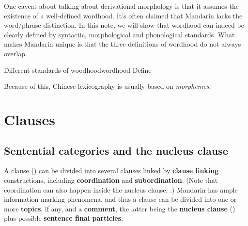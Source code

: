 \documentclass[UTF8, a4paper, oneside, scheme=plain, 12pt]{ctexrep}
\newcommand*{\concept}[1]{\textbf{#1}}
\begin{document}
One caveat about talking about derivational morphology is that it assumes
the existence of a well-defined wordhood.
It's often claimed that Mandarin lacks the word/phrase distinction.
In this note, we will show that wordhood can indeed be clearly defined 
by syntactic, morphological and phonological standards.
What makes Mandarin unique is that the three definitions of wordhood do not always overlap.

\begin{todobox}{Different standards of woodhood}{wordhood}
    Define
\end{todobox}

Because of this, Chinese lexicography is usually based on \emph{morphemes},

\section{Clauses}

\subsection{Sentential categories and the nucleus clause}\label{sec:grammatical.clause.high-level}

A clause () can be divided into several clauses 
linked by \concept{clause linking} constructions,
including \concept{coordination} and \concept{subordination}.
(Note that coordination can also happen inside the nucleus clause;
.)
Mandarin has ample information marking phenomena,
and thus a clause can be divided into
one or more \concept{topics}, if any, and a \concept{comment},
the latter being the \concept{nucleus clause} ()
plus possible \concept{sentence final particles}.
\end{document}
